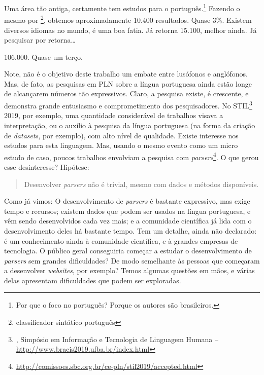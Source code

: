 Uma área tão antiga, certamente tem estudos para o português.\footnote{Por que o foco no português? Porque os autores são brasileiros.} Fazendo o mesmo  por \footnote{classificador sintático português}, obtemos aproximadamente 10.400 resultados. Quase 3\%.
Existem diversos idiomas no mundo, é uma boa fatia.
Já  retorna 15.100, melhor ainda. Já pesquisar por   retorna\ldots

106.000. Quase um terço.

Note, não é o objetivo deste trabalho um embate entre lusófonos e anglófonos. Mas, de fato, as pesquisas em PLN sobre a língua portuguesa ainda estão longe de alcançarem números tão expressivos. Claro, a pesquisa existe, é crescente, e demonstra grande entusiasmo e comprometimento dos pesquisadores. No STIL\footnote{, Simpósio em Informação e Tecnologia de Linguagem Humana --  \url{http://www.bracis2019.ufba.br/index.html}} 2019, por exemplo, uma quantidade considerável de trabalhos visava a interpretação, ou o auxílio à pesquisa da língua portuguesa (na forma da criação de \textit{datasets}, por exemplo), com alto nível de qualidade. Existe interesse nos estudos para esta linguagem. Mas, usando o mesmo evento como um micro estudo de caso, poucos trabalhos envolviam a pesquisa com \textit{parsers}\footnote{\url{http://comissoes.sbc.org.br/ce-pln/stil2019/accepted.html}}. O que gerou esse desinteresse? Hipótese:
\begin{quote}
    Desenvolver \textit{parsers} não é trivial, mesmo com dados e métodos disponíveis.
\end{quote}
Como já vimos: O desenvolvimento de \textit{parsers} é bastante expressivo, mas exige tempo e recursos; existem dados que podem ser usados na língua portuguesa, e vêm sendo desenvolvidos cada vez mais; e a comunidade científica já lida com o desenvolvimento deles há bastante tempo. Tem um detalhe, ainda não declarado: é um conhecimento ainda  à comunidade científica, e à grandes empresas de tecnologia. 
O público geral conseguiria começar a estudar o desenvolvimento de \textit{parsers} sem grandes dificuldades? De modo semelhante às pessoas que começaram a desenvolver \textit{websites}, por exemplo?
Temos algumas questões em mãos, e várias delas apresentam dificuldades que podem ser exploradas.

